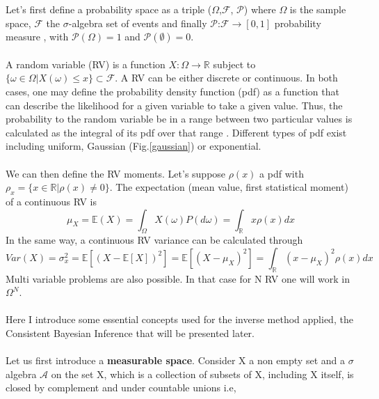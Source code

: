 \documentclass[11pt, a4paper, English]{report}
\begin{document}
\pagestyle{fancy}
\color{blue!40!black}


\color{black}
Let's first define a probability space as a triple ($\Omega$,$\mathcal{F}$, $\mathcal{P}$) where $\Omega$ is the sample space, $\mathcal{F}$ the $\sigma$-algebra set of events and finally $\mathcal{P}$:$\mathcal{F}\longrightarrow[0,1]$ probability measure
\cite{proba}, with $\mathcal{P}(\Omega) = 1$ and $\mathcal{P}(\emptyset) = 0$. %
\\\\
A random variable (RV) is a function $X:\Omega \longrightarrow \mathbb{R}$ subject to $\{\omega \in \Omega|
X(\omega)\leq x\}\subset \mathcal{F}$. A RV can be either discrete or continuous. In both cases, one may define the probability density function (pdf) as a function that can describe the likelihood for a given variable to take a given value. Thus, the probability to the random variable be in a range between two particular values is calculated as the integral of its pdf over that range \cite{pdf}. 
Different types of pdf exist including uniform, Gaussian (Fig.\ref{gaussian}) or exponential.
\\\\
We can then define the RV moments. Let's suppose $\rho(x)$ a pdf with $\rho_x = \{ x \in \mathbb{R}|\rho(x)\neq 0\}$. The expectation (mean value, first statistical moment) of a continuous RV is
$$\mu_X = \mathbb{E}(X) = \int_{\Omega} X(\omega)P(d\omega) = \int_\mathbb{R} x \rho(x) dx $$
In the same way, a continuous RV variance can be calculated through
$$Var(X) = \sigma_x^2 = \mathbb{E}[(X - \mathbb{E}[X])^2] =\mathbb{E}[(X - \mu_X)^2] = \int_\mathbb{R} (x - \mu_X)^2 \rho(x) dx$$
Multi variable problems are also possible. In that case for N RV one will work in $\Omega^N$.\\\\
Here I introduce some essential concepts used for the inverse method applied, the Consistent Bayesian Inference that will be presented later.
\\\\
Let us first introduce a \textbf{measurable space}. Consider X a non empty set and a $\sigma$ algebra $\mathcal{A}$ on the set X, which is a collection of subsets of X, including X itself, is closed by complement and under countable unions i.e,
\end{document}
